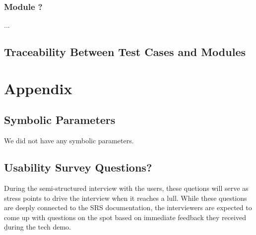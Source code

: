 \documentclass[12pt, titlepage]{article}
\renewcommand{\wss}[1]{}
\begin{document}
\subsubsection{Module ?}

...

\subsection{Traceability Between Test Cases and Modules}

\wss{Provide evidence that all modules have been considered.}

\newpage{}
				




\newpage

\section{Appendix}

\subsection{Symbolic Parameters}

We did not have any symbolic parameters.

\subsection{Usability Survey Questions?}
\label{sec:UsabilitySurvey}

During the semi-structured interview with the users, these quetions will serve as stress points to drive the interview when it reaches a lull. While these questions are deeply connected to the SRS documentation, the interviewers are expected to come up with questions on the spot based on immediate feedback they received \b{during} the tech demo.
\end{document}
